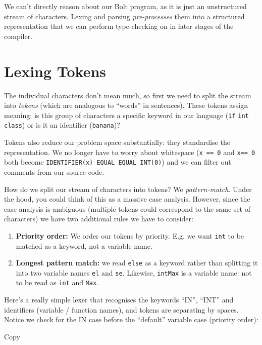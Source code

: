 We can't directly reason about our Bolt program, as it is just an
unstructured stream of characters. Lexing and parsing
\emph{pre-processes} them into a structured representation that we can
perform type-checking on in later stages of the compiler.

\hypertarget{lexing-tokens}{%
\section{\texorpdfstring{\protect\hyperlink{lexing-tokens}{}Lexing
Tokens}{Lexing Tokens}}\label{lexing-tokens}}

The individual characters don't mean much, so first we need to split the
stream into \emph{tokens} (which are analogous to ``words'' in
sentences). These tokens assign meaning: is this group of characters a
specific keyword in our language (\texttt{if} \texttt{int}
\texttt{class}) or is it an identifier (\texttt{banana})?

Tokens also reduce our problem space substantially: they standardise the
representation. We no longer have to worry about whitespace
(\texttt{x\ ==\ 0} and \texttt{x==\ 0} both become
\texttt{IDENTIFIER(x)\ EQUAL\ EQUAL\ INT(0)}) and we can filter out
comments from our source code.

How do we split our stream of characters into tokens? We
\emph{pattern-match}. Under the hood, you could think of this as a
massive case analysis. However, since the case analysis is ambiguous
(multiple tokens could correspond to the same set of characters) we have
two additional rules we have to consider:

\begin{enumerate}
\tightlist
\item
  \textbf{Priority order:} We order our tokens by priority. E.g. we want
  \texttt{int} to be matched as a keyword, not a variable name.
\item
  \textbf{Longest pattern match:} we read \texttt{else} as a keyword
  rather than splitting it into two variable names \texttt{el} and
  \texttt{se}. Likewise, \texttt{intMax} is a variable name: not to be
  read as \texttt{int} and \texttt{Max}.
\end{enumerate}

Here's a really simple lexer that recognises the keywords ``IN'',
``INT'' and identifiers (variable / function names), and tokens are
separating by spaces. Notice we check for the IN case before the
``default'' variable case (priority order):

Copy

